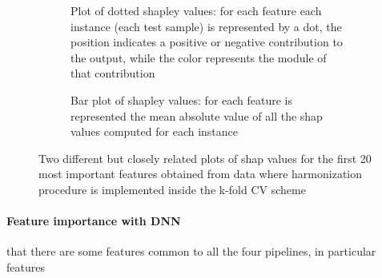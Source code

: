 \documentclass[10pt]{report}
\begin{document}
\begin{figure}[h!]
\centering
\begin{subfigure}[t]{.45\linewidth}
   \caption{Plot of dotted shapley values: for each feature each instance (each test sample) is represented by a dot, the position indicates a positive or negative contribution to the output, while the color represents the module of that contribution}
   \label{fig:shap_dot_kfold}
\end{subfigure}
\hspace{3mm}
\begin{subfigure}[t]{.439\linewidth}
   \caption{Bar plot of shapley values: for each feature is represented the mean absolute value of all the shap values computed for each instance}
   \label{fig:shap_bar_kfold}
\end{subfigure}
\caption{Two different but closely related plots of shap values for the first 20 most important features obtained from data where harmonization procedure is implemented inside the k-fold CV scheme
}
\label{fig:shap_features_kfold_both}
\end{figure}





\newpage
\paragraph{Feature importance with DNN} \hfill

 that there are some features common to all the four pipelines, in particular features
\end{document}
